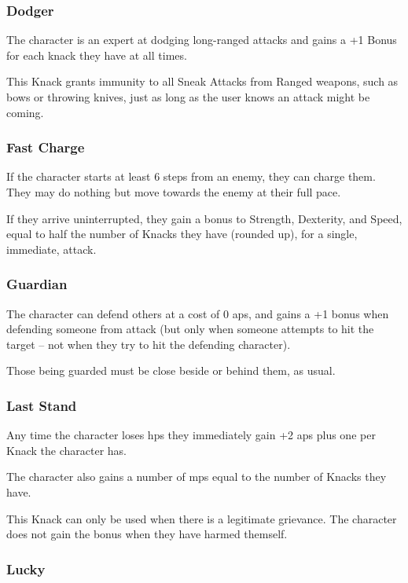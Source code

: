 \begin{multicols}{2}
\subsubsection{Dodger}
\label{dodger}

The character is an expert at dodging long-ranged attacks and gains a +1 Bonus for each knack they have at all times.

This Knack grants immunity to all Sneak Attacks from Ranged weapons, such as bows or throwing knives, just as long as the user knows an attack might be coming.

\subsubsection{Fast Charge}

If the character starts at least 6 steps from an enemy, they can charge them.
They may do nothing but move towards the enemy at their full pace.

If they arrive uninterrupted, they gain a bonus to Strength, Dexterity, and Speed, equal to half the number of Knacks they have (rounded up), for a single, immediate, attack.

\subsubsection{Guardian}

The character can defend others at a cost of 0 \glspl{ap}, and gains a +1 bonus when defending someone from attack (but only when someone attempts to hit the target -- not when they try to hit the defending character).

Those being guarded must be close beside or behind them, as usual.

\subsubsection{Last Stand}

Any time the character loses \glspl{hp} they immediately gain +2 \glspl{ap} plus one per Knack the character has.

The character also gains a number of \glspl{mp} equal to the number of Knacks they have.

This Knack can only be used when there is a legitimate grievance.
The character does not gain the bonus when they have harmed themself.

\subsubsection{Lucky}


\end{multicols}
